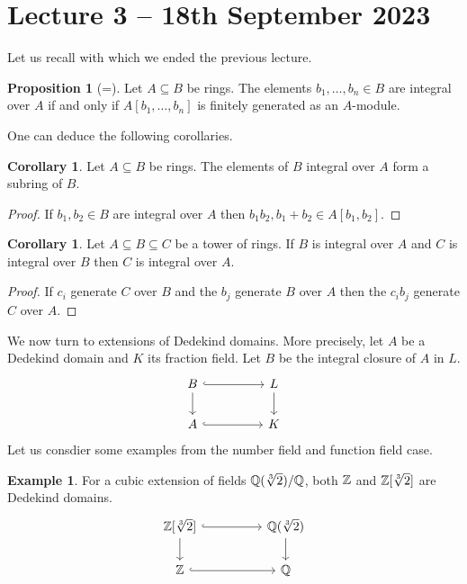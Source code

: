 \documentclass{amsart}
\theoremstyle{definition}
\newtheorem{corollary}[theorem]{Corollary}
\newtheorem{example}[theorem]{Example}
\newtheorem{proposition}[theorem]{Proposition}
\numberwithin{equation}{section}
\begin{document}
\section{Lecture 3 -- 18th September 2023}
Let us recall  with which we ended the previous lecture. 
\begin{proposition}[=]
  Let $A\subseteq B$ be rings. The elements $b_{1},\dots,b_{n}\in B$ are integral over $A$ if and only if $A[b_{1},\dots,b_{n}]$ is finitely generated as an $A$-module. 
\end{proposition}
One can deduce the following corollaries. 
\begin{corollary}\label{corr: integral elements are subring}
  Let $A\subseteq B$ be rings. The elements of $B$ integral over $A$ form a subring of $B$. 
\end{corollary}
\begin{proof}
  If $b_{1},b_{2}\in B$ are integral over $A$ then $b_{1}b_{2}, b_{1}+b_{2}\in A[b_{1},b_{2}]$. 
\end{proof}
\begin{corollary}
  Let $A\subseteq B\subseteq C$ be a tower of rings. If $B$ is integral over $A$ and $C$ is integral over $B$ then $C$ is integral over $A$. 
\end{corollary}
\begin{proof}
  If $c_{i}$ generate $C$ over $B$ and the $b_{j}$ generate $B$ over $A$ then the $c_{i}b_{j}$ generate $C$ over $A$. 
\end{proof}
We now turn to extensions of Dedekind domains. More precisely, let $A$ be a Dedekind domain and $K$ its fraction field. Let $B$ be the integral closure of $A$ in $L$. 
$$%
\begin{tikzcd}
	B && L \\
	A && K
	\arrow[hook, from=2-1, to=2-3]
	\arrow[hook, from=1-1, to=1-3]
	\arrow[from=1-1, to=2-1]
	\arrow[from=1-3, to=2-3]
\end{tikzcd}$$
Let us consdier some examples from the number field and function field case. 
\begin{example}
  For a cubic extension of fields $\mathbb{Q}(\sqrt[3]{2})/\mathbb{Q}$, both $\mathbb{Z}$ and $\mathbb{Z}[\sqrt[3]{2}]$ are Dedekind domains. 
  $$%
  \begin{tikzcd}
    {\ZZ[\sqrt[3]{2}]} && {\QQ(\sqrt[3]{2})} \\
    \ZZ && \QQ
    \arrow[hook, from=2-1, to=2-3]
    \arrow[hook, from=1-1, to=1-3]
    \arrow[from=1-1, to=2-1]
    \arrow[from=1-3, to=2-3]
  \end{tikzcd}$$
\end{example}
\end{document}
